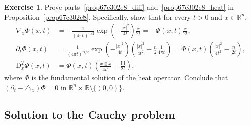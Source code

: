 \documentclass[a4paper,9pt]{amsart}
\newcommand{\R}{\mathbb{R}}	%
\newcommand{\Id}{\mathrm{Id}}	%
\newcommand{\de}{\partial}		%
\newcommand{\Diff}{\mathrm{D}}
\newcommand{\laplacian}{\triangle}
\newcommand{\grad}{\nabla}
\theoremstyle{plain}
\theoremstyle{definition}
\newtheorem{exercise}[proposition]{Exercise}%
\theoremstyle{remark}
\begin{document}
\begin{exercise}
	Prove parts~\ref{prop67c302e8_diff} and~\ref{prop67c302e8_heat} in Proposition~\ref{prop67c302e8}.
	Specifically, show that 
	for every $t>0$ and $x\in\R^n$, 
	\begin{align*}
		\grad_x\Phi(x,t) 
		&= - \frac1{(4\pi t)^{n/2}} \exp\left( -\frac{|x|^2}{4t} \right) \frac{x}{2t}
		= - \Phi(x,t) \frac{x}{2t} , \\
		\de_t \Phi(x,t) 
		&= \frac1{(4\pi t)^{n/2}} \exp\left( -\frac{|x|^2}{4t} \right) 
			\left( \frac{|x|^2}{4t^2} - \frac{n}{2} \frac1{4\pi t} \right) 
		= \Phi(x,t) \left( \frac{|x|^2}{4t^2} - \frac{n}{2t} \right) , \\
		\Diff^2_x\Phi(x,t)
		&= \Phi(x,t) \left( \frac{x\otimes x}{4t^2} - \frac{\Id}{2t} \right) ,
	\end{align*} 
	where $\Phi$ is the fundamental solution of the heat operator.
	Conclude that $(\de_t-\laplacian_x)\Phi=0$ in $\R^n\times\R\setminus\{(0,0)\}$.
\end{exercise}


\subsection{Solution to the Cauchy problem}\label{subs67c30b65}
\end{document}

